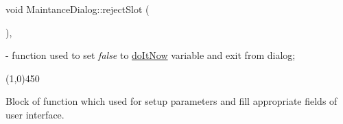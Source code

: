 \mbox{\label{classMaintanceDialog_aa92ce781e64b49dab9cb362c6521bb17}} 
{\footnotesize\ttfamily void Maintance\+Dialog\+::\texorpdfstring{reject\+Slot}{rejectSlot} (\begin{DoxyParamCaption}{ }\end{DoxyParamCaption})\hspace{0.3cm}{\ttfamily [private]}, {\ttfamily [slot]}} - function used to set \textit{false} to \hyperlink{classMaintanceDialog_ae23009895f32bfffb43f5ed93188be45}{do\+It\+Now} variable and exit from dialog;

\begin{center}	\line(1,0){450} \end{center}
Block of function which used for setup parameters and fill appropriate fields of user interface. 
